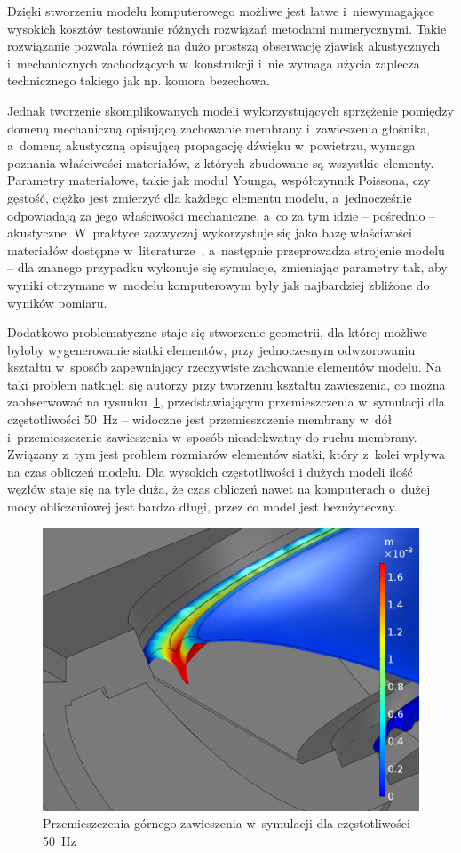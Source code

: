 \documentclass[12pt]{oska}
\begin{document}
	Dzięki stworzeniu modelu komputerowego możliwe jest łatwe i~niewymagające wysokich kosztów testowanie różnych rozwiązań metodami numerycznymi. Takie rozwiązanie pozwala również na dużo prostszą obserwację zjawisk akustycznych i~mechanicznych zachodzących w~konstrukcji i~nie wymaga użycia zaplecza technicznego takiego jak np. komora bezechowa. 
	
	Jednak tworzenie skomplikowanych modeli wykorzystujących sprzężenie pomiędzy domeną mechaniczną opisującą zachowanie membrany i~zawieszenia głośnika, a~domeną akustyczną opisującą propagację dźwięku w~powietrzu, wymaga poznania właściwości materiałów, z których zbudowane są wszystkie elementy. Parametry materiałowe, takie jak moduł Younga, współczynnik Poissona, czy gęstość, ciężko jest zmierzyć dla każdego elementu modelu, a~jednocześnie odpowiadają za jego właściwości mechaniczne, a~co za tym idzie -- pośrednio -- akustyczne. W~praktyce zazwyczaj wykorzystuje się jako bazę właściwości materiałów dostępne w~literaturze~\cite{modelowanie}, a~następnie przeprowadza strojenie modelu -- dla znanego przypadku wykonuje się symulacje, zmieniając parametry tak, aby wyniki otrzymane w~modelu komputerowym były jak najbardziej zbliżone do wyników pomiaru.
	
	Dodatkowo problematyczne staje się stworzenie geometrii, dla której możliwe byłoby wygenerowanie siatki elementów, przy jednoczesnym odwzorowaniu kształtu w~sposób zapewniający rzeczywiste zachowanie elementów modelu. Na taki problem natknęli się autorzy przy tworzeniu kształtu zawieszenia, co można zaobserwować na rysunku~\ref{r:zawieszenie}, przedstawiającym przemieszczenia w~symulacji dla częstotliwości \SI{50}{\hertz} -- widoczne jest przemieszczenie membrany w~dół i~przemieszczenie zawieszenia w~sposób nieadekwatny do ruchu membrany.
	Związany z~tym jest problem rozmiarów elementów siatki, który z~kolei wpływa na czas obliczeń modelu. Dla wysokich częstotliwości i dużych modeli ilość węzłów staje się na tyle duża, że czas obliczeń nawet na komputerach o~dużej mocy obliczeniowej jest bardzo długi, przez co model jest bezużyteczny.
	
	\begin{figure}[!ht]
		\centering
		\includegraphics[width=.7\textwidth]{disp_factor5_f50_02.png}
		\caption{Przemieszczenia górnego zawieszenia w~symulacji dla częstotliwości \SI{50}{\hertz}}
		\label{r:zawieszenie}
	\end{figure}
	
\end{document}

